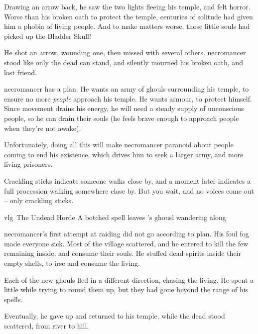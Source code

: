\begin{exampletext}
  Drawing an arrow back, he saw the two lights fleeing his temple, and felt horror.
  Worse than his broken oath to protect the temple, centuries of solitude had given him a phobia of living people.
  And to make matters worse, those little souls had picked up the Bladder Skull!

  He shot an arrow, wounding one, then missed with several others.
  \Gls{necromancer} stood like only the dead can stand, and silently mourned his broken oath, and lost friend.

\end{exampletext}

\noindent
\Gls{necromancer} has a plan.
He wants an army of ghouls surrounding his temple, to ensure no more \emph{people} approach his temple.
He wants armour, to protect himself.
Since movement drains his energy, he will need a steady supply of unconscious people, so he can drain their souls (he feels brave enough to approach people when they're not awake).

Unfortunately, doing all this will make \gls{necromancer} paranoid about people coming to end his existence, which drives him to seek a larger army, and more living prisoners.


\begin{boxtext}
  Crackling sticks indicate someone walks close by, and a moment later indicates a full procession walking somewhere close by.
  But you wait, and no voices come out -- only crackling sticks.
\end{boxtext}

{\gls{vlg}~The Undead Horde}%
{A botched spell leaves 's ghousl wandering along}%

\begin{exampletext}
  \Gls{necromancer}'s first attempt at raiding  did not go according to plan.
  His foul fog made everyone sick.
  Most of the \gls{village} scattered, and he entered to kill the few remaining inside, and consume their souls.
  He stuffed dead spirits inside their empty shells, to irse and consume the living.

  Each of the new ghouls fled in a different direction, chasing the living.
  He spent a little while trying to round them up, but they had gone beyond the range of his spells.

  Eventually, he gave up and returned to his temple, while the dead stood scattered, from river to hill.
\end{exampletext}


